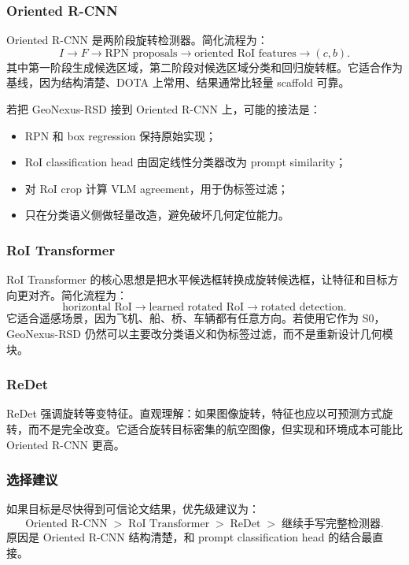 \documentclass[11pt,a4paper]{ctexart}
\begin{document}
\subsubsection*{Oriented R-CNN}

Oriented R-CNN 是两阶段旋转检测器。简化流程为：
\[
I\rightarrow F\rightarrow \text{RPN proposals}\rightarrow
\text{oriented RoI features}\rightarrow
(c,b).
\]
其中第一阶段生成候选区域，第二阶段对候选区域分类和回归旋转框。它适合作为基线，因为结构清楚、DOTA 上常用、结果通常比轻量 scaffold 可靠。

若把 GeoNexus-RSD 接到 Oriented R-CNN 上，可能的接法是：
\begin{itemize}
  \item RPN 和 box regression 保持原始实现；
  \item RoI classification head 由固定线性分类器改为 prompt similarity；
  \item 对 RoI crop 计算 VLM agreement，用于伪标签过滤；
  \item 只在分类语义侧做轻量改造，避免破坏几何定位能力。
\end{itemize}

\subsubsection*{RoI Transformer}

RoI Transformer 的核心思想是把水平候选框转换成旋转候选框，让特征和目标方向更对齐。简化流程为：
\[
\text{horizontal RoI}\rightarrow
\text{learned rotated RoI}\rightarrow
\text{rotated detection}.
\]
它适合遥感场景，因为飞机、船、桥、车辆都有任意方向。若使用它作为 S0，GeoNexus-RSD 仍然可以主要改分类语义和伪标签过滤，而不是重新设计几何模块。

\subsubsection*{ReDet}

ReDet 强调旋转等变特征。直观理解：如果图像旋转，特征也应以可预测方式旋转，而不是完全改变。它适合旋转目标密集的航空图像，但实现和环境成本可能比 Oriented R-CNN 更高。

\subsubsection*{选择建议}

如果目标是尽快得到可信论文结果，优先级建议为：
\[
\text{Oriented R-CNN} \;>\; \text{RoI Transformer} \;>\; \text{ReDet} \;>\; \text{继续手写完整检测器}.
\]
原因是 Oriented R-CNN 结构清楚，和 prompt classification head 的结合最直接。
\end{document}
